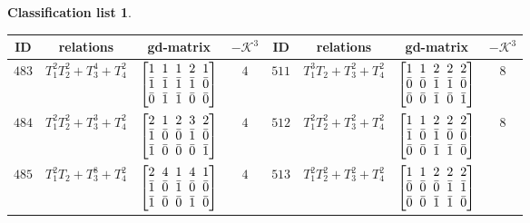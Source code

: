 \documentclass[10pt,a4paper]{amsart}
\theoremstyle{definition}
\newtheorem{class-list}[thm]{Classification list}
\numberwithin{equation}{section}
\begin{document}
\begin{class-list}
\begin{table}[t!]\centering\setlength{\tabcolsep}{3.5pt}
\renewcommand{\arraystretch}{1.05}\small\tabulinesep=1mm
\begin{tabu}{c|c|c|c||c|c|c|c}
\hline
ID&relations&gd-matrix&$-\mathcal{K}^3$&ID&relations&gd-matrix&$-\mathcal{K}^3$
\\
\hline
${483}$&${T_{1}^{2}T_{2}^{2}+T_{3}^{4}+T_{4}^{2}}$
&$\arraycolsep=1mm\begin{bmatrix}{1} & {1} & {1} & {2} & {1} \\ {\bar{1}} & {\bar{1}} & {\bar{1}} & {\bar{1}} & {\bar{0}} \\ {\bar{0}} & {\bar{1}} & {\bar{1}} & {\bar{0}} & {\bar{0}}\end{bmatrix}$
&${4}$
&${511}$&${T_{1}^{3}T_{2}+T_{3}^{2}+T_{4}^{2}}$
&$\arraycolsep=1mm\begin{bmatrix}{1} & {1} & {2} & {2} & {2} \\ {\bar{0}} & {\bar{0}} & {\bar{1}} & {\bar{1}} & {\bar{0}} \\ {\bar{0}} & {\bar{0}} & {\bar{1}} & {\bar{0}} & {\bar{1}}\end{bmatrix}$
&${8}$
\\
\hline
${484}$&${T_{1}^{2}T_{2}^{2}+T_{3}^{3}+T_{4}^{2}}$
&$\arraycolsep=1mm\begin{bmatrix}{2} & {1} & {2} & {3} & {2} \\ {\bar{1}} & {\bar{0}} & {\bar{0}} & {\bar{1}} & {\bar{0}} \\ {\bar{1}} & {\bar{0}} & {\bar{0}} & {\bar{0}} & {\bar{1}}\end{bmatrix}$
&${4}$
&${512}$&${T_{1}^{2}T_{2}^{2}+T_{3}^{2}+T_{4}^{2}}$
&$\arraycolsep=1mm\begin{bmatrix}{1} & {1} & {2} & {2} & {2} \\ {\bar{1}} & {\bar{0}} & {\bar{1}} & {\bar{0}} & {\bar{0}} \\ {\bar{0}} & {\bar{0}} & {\bar{1}} & {\bar{1}} & {\bar{0}}\end{bmatrix}$
&${8}$
\\
\hline
${485}$&${T_{1}^{2}T_{2}+T_{3}^{8}+T_{4}^{2}}$
&$\arraycolsep=1mm\begin{bmatrix}{2} & {4} & {1} & {4} & {1} \\ {\bar{1}} & {\bar{0}} & {\bar{1}} & {\bar{0}} & {\bar{0}} \\ {\bar{1}} & {\bar{0}} & {\bar{0}} & {\bar{1}} & {\bar{0}}\end{bmatrix}$
&${4}$
&${513}$&${T_{1}^{2}T_{2}^{2}+T_{3}^{2}+T_{4}^{2}}$
&$\arraycolsep=1mm\begin{bmatrix}{1} & {1} & {2} & {2} & {2} \\ {\bar{0}} & {\bar{0}} & {\bar{0}} & {\bar{1}} & {\bar{1}} \\ {\bar{0}} & {\bar{0}} & {\bar{1}} & {\bar{1}} & {\bar{0}}\end{bmatrix}$

\end{tabu}
\end{table}
\end{class-list}
\end{document}
